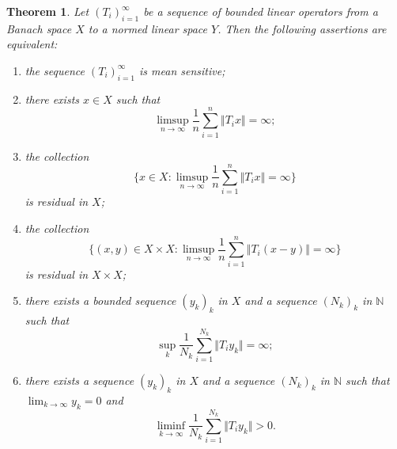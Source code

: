 \documentclass[12pt,a4paper]{amsart}
\theoremstyle{definition}
\theoremstyle{plain}
\newtheorem{thm}[defn]{Theorem}
\begin{document}
\begin{thm} \label{thm:mean-sensitive}
    Let $(T_i)_{i=1}^{\infty}$ be a sequence of bounded linear operators from a Banach space $X$ to a normed linear space $Y$.
    Then the following assertions are equivalent:
    \begin{enumerate}
        \item \label{thm1: mean sensitive}
              the sequence $(T_i)_{i=1}^{\infty}$  is mean sensitive;
        \item \label{thm2: x unbounded}
              there exists $x\in X$ such that
              \[
                  \limsup_{n\to{\infty}}\frac{1}{n}\sum_{i=1}^{n}\Vert T_i x\Vert=\infty;
              \]
        \item \label{thm3: residual points in X}
              the collection
              \[
                  \biggl \{ x\in X\colon \limsup_{n\to{\infty}}\frac{1}{n}\sum_{i=1}^{n} \Vert T_i x\Vert=\infty \biggr \}
              \]
              is residual in $X$;

        \item \label{thm4: residual points in X*X}
              the collection
              \[
                  \biggl\{ (x,y)\in X\times X\colon \limsup_{n\to{\infty}}\frac{1}{n}\sum_{i=1}^{n}\Vert T_i (x-y)\Vert=\infty \biggr \}
              \]
              is residual in $X\times X$;

        \item \label{thm5: bounded sequence}
              there exists a bounded sequence  $(y_k)_k$ in $X$ and a sequence $(N_k)_k$ in $\mathbb{N}$ such that
              \[
                  \sup_k\frac{1}{N_k}\sum_{i=1}^{N_k}\Vert T_i y_k\Vert=\infty;
              \]
        \item \label{thm6: sequence to 0}
              there exists a sequence  $(y_k)_k$ in $X$ and a sequence $(N_k)_k$ in $\mathbb{N}$ such that $\lim_{k\to\infty}y_k=0$ and
              \[
                  \liminf_{k\to\infty} \frac{1}{N_k}\sum_{i=1}^{N_k}\Vert T_i y_k\Vert>0.
              \]
    \end{enumerate}
\end{thm}
\end{document}
